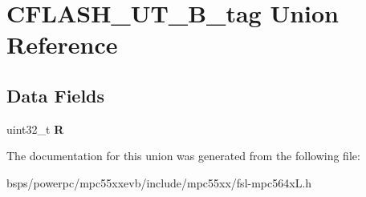 \hypertarget{unionCFLASH__UT__32B__tag}{}\section{C\+F\+L\+A\+S\+H\+\_\+\+U\+T\+\_\+B\+\_\+tag Union Reference}
\label{unionCFLASH__UT__32B__tag}
\subsection*{Data Fields}
\begin{DoxyCompactItemize}
\item 
\mbox{\label{unionCFLASH__UT__32B__tag_a2034f99383eb4609370a2fe4819ddc19}} 
uint32\+\_\+t {\bfseries R}
\end{DoxyCompactItemize}


The documentation for this union was generated from the following file\+:\begin{DoxyCompactItemize}
\item 
bsps/powerpc/mpc55xxevb/include/mpc55xx/fsl-\/mpc564x\+L.\+h\end{DoxyCompactItemize}
